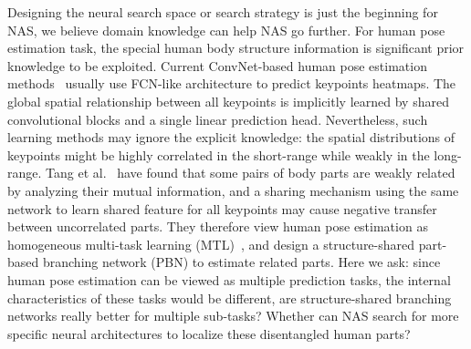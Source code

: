 \documentclass[journal]{IEEEtran}
\begin{document}
Designing the neural search space or search strategy is just the beginning for NAS, we believe domain knowledge can help NAS go further. For human pose estimation task, the special human body structure information is significant prior knowledge to be exploited. Current ConvNet-based human pose estimation methods~\cite{wei2016convolutional, cao2017realtime, papandreou2017towards, fang2017rmpe, yang2017learning, chen2018cascaded, xiao2018simple, Sun_2019_CVPR} usually use FCN-like architecture to predict keypoints heatmaps. The global spatial relationship between all keypoints is implicitly learned by shared convolutional blocks and a single linear prediction head. Nevertheless, such learning methods may ignore the explicit knowledge: the spatial distributions of keypoints might be highly correlated in the short-range while weakly in the long-range. Tang et al.~\cite{Tang_2019_CVPR} have found that some pairs of body parts are weakly related by analyzing their mutual information, and a sharing mechanism using the same network to learn shared feature for all keypoints may cause negative transfer between uncorrelated parts. They therefore view human pose estimation as homogeneous multi-task learning (MTL)~\cite{caruana1998multitask,ruder2017an}, and design a structure-shared part-based branching network (PBN) to estimate related parts. Here we ask: since human pose estimation can be viewed as multiple prediction tasks, the internal characteristics of these tasks would be different, are structure-shared branching networks really better for multiple sub-tasks? Whether can NAS search for more specific neural architectures to localize these disentangled human parts?
\end{document}
